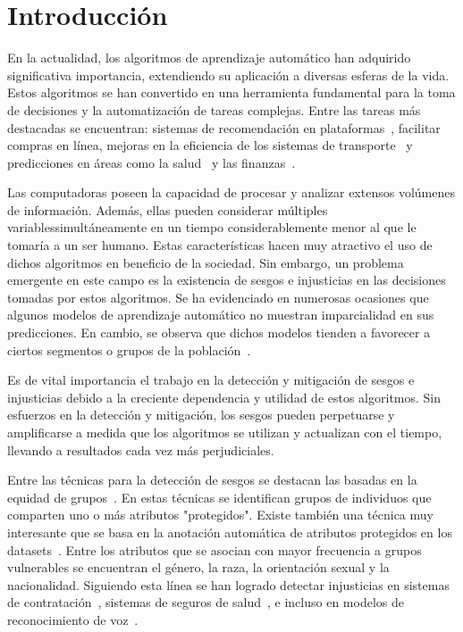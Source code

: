 \chapter*{Introducción}\label{chapter:introduction}
En la actualidad, los algoritmos de aprendizaje autom\'atico han adquirido significativa importancia, extendiendo su aplicaci\'on a 
diversas esferas de la vida. Estos algoritmos se han convertido en una herramienta fundamental para la toma de decisiones y la 
automatizaci\'on de tareas complejas. Entre las tareas m\'as destacadas se encuentran: sistemas de recomendaci\'on en 
plataformas~\parencite{esmaeilzadeh2022abuse, bhattacharya2022augmenting}, facilitar compras en l\'inea, mejoras en la eficiencia 
de los sistemas de transporte~\parencite{autonomous_driving} y predicciones en \'areas como la salud~\parencite{roy2023machine} y 
las finanzas~\parencite{sen2021machine}.

Las computadoras poseen la capacidad de procesar y analizar extensos vol\'umenes de informaci\'on. Adem\'as, ellas pueden considerar 
m\'ultiples variablessimult\'aneamente en un tiempo considerablemente menor al que le tomar\'ia a un ser humano. Estas caracter\'isticas 
hacen muy atractivo el uso de dichos algoritmos en beneficio de la sociedad. Sin embargo, un problema emergente en este campo es la 
existencia de sesgos e injusticias en las decisiones tomadas por estos algoritmos. Se ha evidenciado en numerosas ocasiones que algunos 
modelos de aprendizaje autom\'atico no muestran imparcialidad en sus predicciones. En cambio, se observa que dichos modelos tienden a 
favorecer a ciertos segmentos o grupos de la poblaci\'on~\parencite{survey}.

Es de vital importancia el trabajo en la detecci\'on y mitigaci\'on de sesgos e injusticias debido a la creciente dependencia y 
utilidad de estos algoritmos. Sin esfuerzos en la detecci\'on y mitigaci\'on, los sesgos pueden perpetuarse y amplificarse a medida 
que los algoritmos se utilizan y actualizan con el tiempo, llevando a resultados cada vez m\'as perjudiciales.

Entre las t\'ecnicas para la detecci\'on de sesgos se destacan las basadas en la equidad de grupos~\parencite{fairmodels}. 
En estas t\'ecnicas se identifican grupos de individuos que comparten uno o m\'as atributos "protegidos". Existe tambi\'en una 
t\'ecnica muy interesante que se basa en la anotaci\'on autom\'atica de atributos protegidos en los 
datasets~\parencite{soumah2023radar,dinan2020multidimensional,10.1007/978-3-031-35320-8_39}. Entre los atributos que se asocian 
con mayor frecuencia a grupos vulnerables se encuentran el g\'enero, la raza, la orientaci\'on sexual y la nacionalidad. 
Siguiendo esta l\'inea se han logrado detectar injusticias en sistemas de contrataci\'on~\parencite{examples_dis}, sistemas de 
seguros de salud~\parencite{examples_dis}, e incluso en modelos de reconocimiento de voz~\parencite{voice_bias}.

